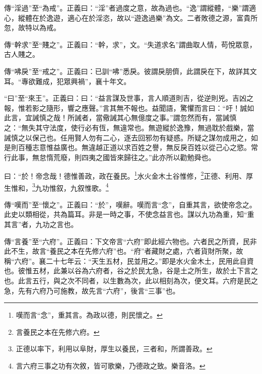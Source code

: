 {\noindent\zhuan{}\fzbyks 傳“淫過”至“為戒”。正義曰：“淫”者過度之意，故為過也。“逸”謂縱體，“樂”謂適心，縱體在於逸遊，適心在於淫恣，故以“遊逸過樂”為文。二者敗德之源，富貴所忽，故特以為戒。 \par}

{\noindent\zhuan{}\fzbyks 傳“幹求”至“賤之”。正義曰：“幹，求”，文。“失道求名”謂曲取人情，苟悅眾意，古人賤之。 \par}

{\noindent\zhuan{}\fzbyks 傳“咈戾”至“戒之”。正義曰：已訓“咈”悉戾。彼謂戾朋儕，此謂戾在下，故詳其文耳。“專欲難成，犯眾興禍”，襄十年文。 \par}

{\noindent\shu{}\fzkt “曰”至“來王”。正義曰：曰：“益言謀及世事，言人順道則吉，從逆則兇。吉凶之報，惟若影之隨形，響之應聲。”言其無不報也。益聞語，驚懼而言曰：“吁！誠如此言，宜誡慎之哉！所誡者，當儆誡其心無億度之事。”謂忽然而有，當誡慎之：“無失其守法度，使行必有恆，無違常也。無遊縱於逸豫，無過耽於戲樂，當誡慎之以保己也。任用賢人勿有二心，逐去回邪勿有疑惑。所疑之謀勿成用之，如是則百種志意惟益廣也。無違越正道以求百姓之譽，無反戾百姓以從己心之慾。常行此事，無怠惰荒廢，則四夷之國皆來歸往之。”此亦所以勸勉舜也。 \par}

曰：“於！帝念哉！德惟善政，政在養民。\footnote{嘆而言“念”，重其言。為政以德，則民懷之。}水火金木土谷惟修，\footnote{言養民之本在先修六府。}正德、利用、厚生惟和，\footnote{正德以率下，利用以阜財，厚生以養民，三者和，所謂善政。}九功惟叙，九叙惟歌。\footnote{言六府三事之功有次敘，皆可歌樂，乃德政之致。樂音洛。}

{\noindent\zhuan{}\fzbyks 傳“嘆而”至“懷之”。正義曰：“於”，嘆辭。嘆而言“念”，自重其言，欲使帝念之。此史以類相從，共為篇耳。非是一時之事，不使念益言也。謀以九功為重，知“重其言”者，九功之言也。 \par}

{\noindent\zhuan{}\fzbyks 傳“言養”至“六府”。正義曰：下文帝言“六府”即此經六物也。六者民之所資，民非此不生，故言“養民之本在先修六府”也。“府”者藏財之處，六者貨財所聚，故稱“六府”。襄二十七年云：“天生五材，民並用之。”即是水火金木土，民用此自資也。彼惟五材，此兼以谷為六府者，谷之於民尢急，谷是土之所生，故於土下言之也。此言五行，與之次不同者，以生數為次，此以相刻為次，便文耳。六府是民之急，先有六府乃可施教，故先言“六府”，後言“三事”也。 \par}


